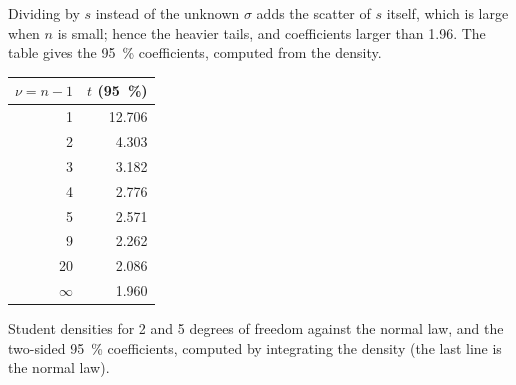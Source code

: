 \admitted

Dividing by $s$ instead of the unknown $\sigma$ adds the scatter of $s$ itself, which is large when $n$ is
small; hence the heavier tails, and coefficients larger than 1.96. The table gives the 95~\%
coefficients, computed from the density.

\begin{omfigure}
\begin{minipage}[c]{0.56\linewidth}
\end{minipage}\hfill
\begin{minipage}[c]{0.4\linewidth}\centering
\small
\begin{tabular}{rr}
\hline
$\nu = n - 1$ & $t$ (95~\%) \\
\hline
1 & 12.706 \\
2 & 4.303 \\
3 & 3.182 \\
4 & 2.776 \\
5 & 2.571 \\
9 & 2.262 \\
20 & 2.086 \\
$\infty$ & 1.960 \\
\hline
\end{tabular}
\end{minipage}
\par\vspace{4pt}

{\small Student densities for 2 and 5 degrees of freedom against the normal law, and the two-sided
95~\% coefficients, computed by integrating the density (the last line is the normal law).}
\end{omfigure}


